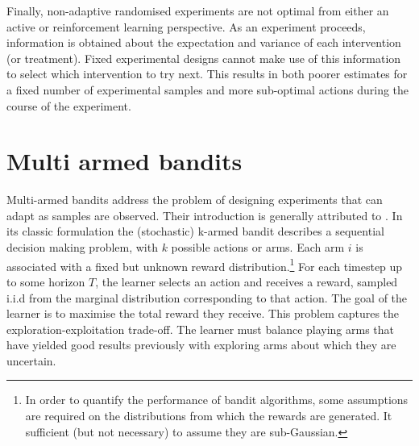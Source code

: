 \documentclass[11pt,a4paper,twoside]{report}
\theoremstyle{plain}
\theoremstyle{definition}
\begin{document}
Finally, non-adaptive randomised experiments are not optimal from either an active or reinforcement learning perspective. As an experiment proceeds, information is obtained about the expectation and variance of each intervention (or treatment). Fixed experimental designs cannot make use of this information to select which intervention to try next. This results in both poorer estimates for a fixed number of experimental samples and more sub-optimal actions during the course of the experiment.

\section{Multi armed bandits}
\label{sec:multi-armed-bandits}

Multi-armed bandits address the problem of designing experiments that can adapt as samples are observed. Their introduction is generally attributed to \citet{Thompson1993}. In its classic formulation \citep{Robbins1952,Lai1985} the (stochastic) k-armed bandit describes a sequential decision making problem, with $k$ possible actions or arms. Each arm $i$ is associated with a fixed but unknown reward distribution.\footnote{In order to quantify the performance of bandit algorithms, some assumptions are required on the distributions from which the rewards are generated. It sufficient (but not necessary) to assume they are sub-Gaussian.} For each timestep up to some horizon $T$, the learner selects an action and receives a reward, sampled i.i.d from the marginal distribution corresponding to that action. The goal of the learner is to maximise the total reward they receive. This problem captures the exploration-exploitation trade-off. The learner must balance playing arms that have yielded good results previously with exploring arms about which they are uncertain.
\end{document}
